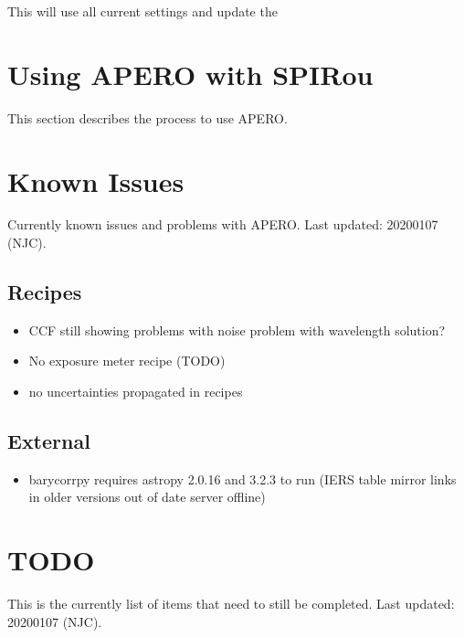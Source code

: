 \documentclass[a4paper,10pt,english]{report}
\begin{document}
This will use all current settings and update the


\section{Using APERO with SPIRou}
\label{\detokenize{user/general/using_apero_default:using-apero-with-spirou}}\label{\detokenize{user/general/using_apero_default:using-apero-default}}\label{\detokenize{user/general/using_apero_default::doc}}
This section describes the process to use APERO.


\section{Known Issues}
\label{\detokenize{user/general/known_issues:known-issues}}\label{\detokenize{user/general/known_issues:id1}}\label{\detokenize{user/general/known_issues::doc}}
Currently known issues and problems with APERO.
Last updated: 2020\sphinxhyphen{}01\sphinxhyphen{}07 (NJC).


\subsection{Recipes}
\label{\detokenize{user/general/known_issues:recipes}}\begin{itemize}
\item {} 
CCF still showing problems with noise \sphinxhyphen{} problem with wavelength solution?

\item {} 
No exposure meter recipe (TODO)

\item {} 
no uncertainties propagated in recipes

\end{itemize}


\subsection{External}
\label{\detokenize{user/general/known_issues:external}}\begin{itemize}
\item {} 
barycorrpy requires astropy 2.0.16 and 3.2.3 to run (IERS table mirror links
in older versions out of date \sphinxhyphen{} server offline)

\end{itemize}


\section{TODO}
\label{\detokenize{user/general/todo:todo}}\label{\detokenize{user/general/todo:id1}}\label{\detokenize{user/general/todo::doc}}
This is the currently list of items that need to still be completed.
Last updated: 2020\sphinxhyphen{}01\sphinxhyphen{}07 (NJC).
\end{document}
